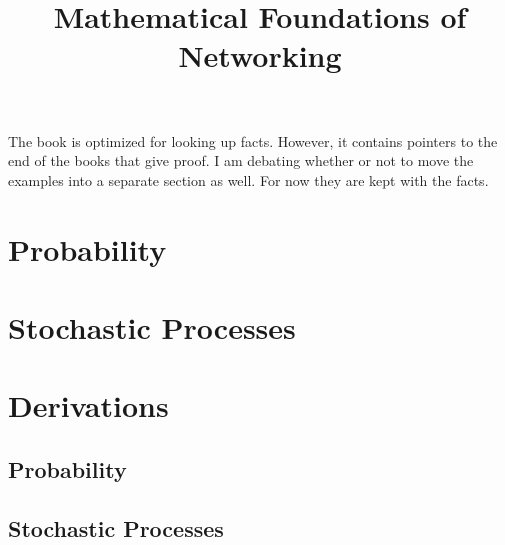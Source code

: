 \documentclass[letterpaper,12pt]{article}
\title{Mathematical Foundations of Networking}
\begin{document}
\raggedright

\setlength{\columnseprule}{0.5pt}
\setcounter{tocdepth}{4}
\setcounter{secnumdepth}{6}
\tableofcontents

The book is optimized for looking up facts. However, it contains pointers to the
end of the books that give proof. I am debating whether or not to move the
examples into a separate section as well. For now they are kept with the facts. 

\section{Probability}

\section{Stochastic Processes}


\section{Derivations}
\subsection{Probability}

\subsection{Stochastic Processes}

\end{document}
